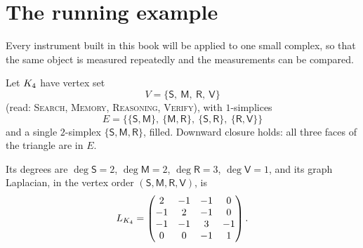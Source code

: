 \section{The running example}\label{sec:running}

Every instrument built in this book will be applied to one small
complex, so that the same object is measured repeatedly and the
measurements can be compared.

\begin{example}\label{ex:K4}
Let $K_4$ have vertex set
\[
  V=\{\mathsf{S},\ \mathsf{M},\ \mathsf{R},\ \mathsf{V}\}
\]
(read: \textsc{Search}, \textsc{Memory}, \textsc{Reasoning},
\textsc{Verify}), with $1$-simplices
\[
  E=\bigl\{\{\mathsf{S},\mathsf{M}\},\ \{\mathsf{M},\mathsf{R}\},\
  \{\mathsf{S},\mathsf{R}\},\ \{\mathsf{R},\mathsf{V}\}\bigr\}
\]
and a single $2$-simplex $\{\mathsf{S},\mathsf{M},\mathsf{R}\}$, filled.
Downward closure holds: all three faces of the triangle are in $E$.
\end{example}

\begin{center}
\label{fig:K4}
\end{center}

Its degrees are
$\deg\mathsf{S}=2$, $\deg\mathsf{M}=2$, $\deg\mathsf{R}=3$,
$\deg\mathsf{V}=1$, and its graph Laplacian, in the vertex order
$(\mathsf{S},\mathsf{M},\mathsf{R},\mathsf{V})$, is
\begin{equation}\label{eq:LK4}
  L_{K_4}=
  \begin{pmatrix}
     2 & -1 & -1 &  0\\
    -1 &  2 & -1 &  0\\
    -1 & -1 &  3 & -1\\
     0 &  0 & -1 &  1
  \end{pmatrix}.
\end{equation}

